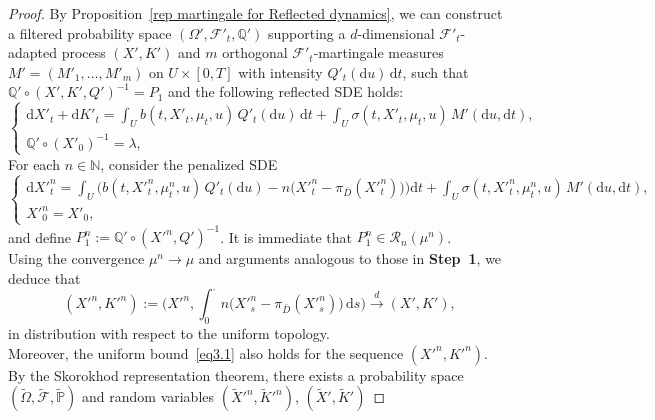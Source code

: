 \documentclass[10pt,a4paper]{amsart}
\begin{document}
\begin{proof}
By Proposition~\ref{rep martingale for Reflected dynamics}, 
we can construct a filtered probability space 
$(\Omega', \mathcal{F}'_t, \mathbb{Q}')$
supporting a $d$-dimensional 
$\mathcal{F}'_t$-adapted process 
$(X', K')$ and 
$m$ orthogonal $\mathcal{F}'_t$-martingale measures 
$ M' = (M'_1, \ldots, M'_m) $
on $ U \times [0,T]$ with intensity 
$ Q'_t(\mathrm{d}u)\,\mathrm{d}t$,
such that 
$ \mathbb{Q}' \circ (X', K', Q')^{-1} = P_1 $
and the following reflected SDE holds:
\begin{equation}\label{eq:refSDEX'}
\begin{cases}
\mathrm{d}X'_t+
\mathrm{d}K'_t
= 
\displaystyle\int_U b(t, X'_t, \mu_t, u)\,
Q'_t(\mathrm{d}u)\,\mathrm{d}t
+
\displaystyle\int_U \sigma(t, X'_t, \mu_t, u)\,
M'(\mathrm{d}u, \mathrm{d}t)
, \\[6pt]
\mathbb{Q}'\circ(X'_0)^{-1} = \lambda,
\end{cases}
\end{equation}
For each $ n \in \mathbb{N} $, consider the penalized SDE
\begin{equation}\label{eq:penalXn}
\begin{cases}
\mathrm{d}X'^n_t
=
\displaystyle\int_U 
\Big(b(t, X'^n_t, \mu^n_t, u)\,Q'_t(\mathrm{d}u)
- n\big(X'^n_t - \pi_{\bar{D}}(X'^n_t)\big)\Big)
\mathrm{d}t
+
\displaystyle\int_U 
\sigma(t, X'^n_t, \mu^n_t, u)\,
M'(\mathrm{d}u, \mathrm{d}t),\\
X'^n_0 = X'_{0},
\end{cases}
\end{equation}
and define 
$ P^n_1 := \mathbb{Q}' \circ (X'^n, Q')^{-1} $.
It is immediate that 
$P^n_1 \in \mathcal{R}_n(\mu^n) $.\\
Using the convergence $ \mu^n \to \mu $ and arguments analogous to those in \textbf{Step~1}, 
we deduce that
\begin{equation}\label{eq:convXnKn}
(X'^n, K'^n)
:=
\Biggl(X'^n, 
\int_0^{\cdot} n \bigl(X'^n_s - \pi_{\bar{D}}(X'^n_s)\bigr)\, \mathrm{d}s \Biggr)
\xrightarrow{d} 
(X', K'),
\end{equation}
in distribution with respect to the uniform topology.\\
Moreover, the uniform bound~\eqref{eq3.1} also holds for the sequence $(X'^n, K'^n)$.\\
By the Skorokhod representation theorem, 
there exists a probability space 
$(\tilde{\Omega}, \tilde{\mathcal{F}}, \tilde{\mathbb{P}})$ 
and random variables 
$(\tilde{X}'^n, \tilde{K}'^n)$, 
$(\tilde{X}', \tilde{K}')$

\end{proof}
\end{document}
